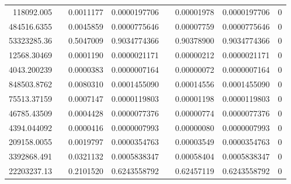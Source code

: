 \documentclass[
journal=jacsat, %
manuscript=article]{achemso}
\begin{document}
\begin{table}[htbp]
{\begin{tabular}{rrrrrrrr}
    118092.005 &       & 0.0011177 & 0.0000197706 &       & 0.00001978 & 0.0000197706 & 0 \\
    484516.6355 &       & 0.0045859 & 0.0000775646 &       & 0.00007759 & 0.0000775646 & 0 \\
    53323285.36 &       & 0.5047009 & 0.9034774366 &       & 0.90378900 & 0.9034774366 & 0 \\
    12568.30469 &       & 0.0001190 & 0.0000021171 &       & 0.00000212 & 0.0000021171 & 0 \\
    4043.200239 &       & 0.0000383 & 0.0000007164 &       & 0.00000072 & 0.0000007164 & 0 \\
    848503.8762 &       & 0.0080310 & 0.0001455090 &       & 0.00014556 & 0.0001455090 & 0 \\
    75513.37159 &       & 0.0007147 & 0.0000119803 &       & 0.00001198 & 0.0000119803 & 0 \\
    46785.43509 &       & 0.0004428 & 0.0000077376 &       & 0.00000774 & 0.0000077376 & 0 \\
    4394.044092 &       & 0.0000416 & 0.0000007993 &       & 0.00000080 & 0.0000007993 & 0 \\
    209158.0055 &       & 0.0019797 & 0.0000354763 &       & 0.00003549 & 0.0000354763 & 0 \\
    3392868.491 &       & 0.0321132 & 0.0005838347 &       & 0.00058404 & 0.0005838347 & 0 \\
    22203237.13 &       & 0.2101520 & 0.6243558792 &       & 0.62457119 & 0.6243558792 & 0 \\
    \bottomrule
    \end{tabular}%
    }
  \label{tab:addlabel}%
\end{table}%
\end{document}
